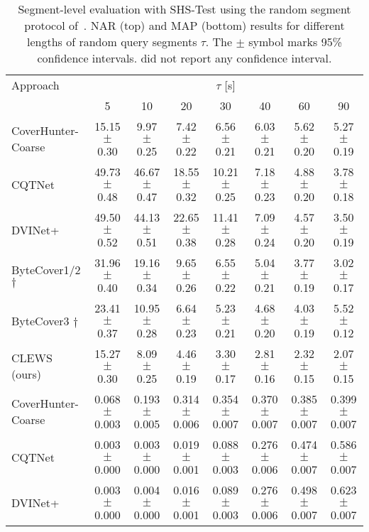 \begin{table*}[h]
\caption{Segment-level evaluation with SHS-Test using the random segment protocol of~\citet{du_bytecover3_2023}. NAR (top) and MAP (bottom) results for different lengths of random query segments $\tau$. The $\pm$ symbol marks 95\% confidence intervals. \citet{du_bytecover3_2023} did not report any confidence interval.}
\label{tab:seg_shsrand}
\vskip 0.15in
\begin{adjustbox}{max width=\textwidth}
\begin{sc}
\begin{tabular}{lccccccc}
\toprule
Approach & \multicolumn{7}{c}{$\tau$ [s]} \\
        \cline{2-8}
    & 5 & 10 & 20 & 30 & 40 & 60 & 90 \\
\midrule
CoverHunter-Coarse & 15.15 $\pm$ 0.30 & 9.97 $\pm$ 0.25 & 7.42 $\pm$ 0.22 & 6.56 $\pm$ 0.21 & 6.03 $\pm$ 0.21 & 5.62 $\pm$ 0.20 & 5.27 $\pm$ 0.19 \\
CQTNet & 49.73 $\pm$ 0.48 & 46.67 $\pm$ 0.47 & 18.55 $\pm$ 0.32 & 10.21 $\pm$ 0.25 & 7.18 $\pm$ 0.23 & 4.88 $\pm$ 0.20 & 3.78 $\pm$ 0.18 \\
DVINet+ & 49.50 $\pm$ 0.52 & 44.13 $\pm$ 0.51 & 22.65 $\pm$ 0.38 & 11.41 $\pm$ 0.28 & 7.09 $\pm$ 0.24 & 4.57 $\pm$ 0.20 & 3.50 $\pm$ 0.19 \\
ByteCover1/2 $\dag$ & 31.96 $\pm$ 0.40 & 19.16 $\pm$ 0.34 & 9.65 $\pm$ 0.26 & 6.55 $\pm$ 0.22 & 5.04 $\pm$ 0.21 & 3.77 $\pm$ 0.19 & 3.02 $\pm$ 0.17 \\
ByteCover3 $\dag$ & 23.41 $\pm$ 0.37 & 10.95 $\pm$ 0.28 & 6.64 $\pm$ 0.23 & 5.23 $\pm$ 0.21 & 4.68 $\pm$ 0.20 & 4.03 $\pm$ 0.19 & 5.52 $\pm$ 0.12 \\
CLEWS (ours) & 15.27 $\pm$ 0.30 & 8.09 $\pm$ 0.25 & 4.46 $\pm$ 0.19 & 3.30 $\pm$ 0.17 & 2.81 $\pm$ 0.16 & 2.32 $\pm$ 0.15 & 2.07 $\pm$ 0.15 \\
\midrule
CoverHunter-Coarse & 0.068 $\pm$ 0.003 & 0.193 $\pm$ 0.005 & 0.314 $\pm$ 0.006 & 0.354 $\pm$ 0.007 & 0.370 $\pm$ 0.007 & 0.385 $\pm$ 0.007 & 0.399 $\pm$ 0.007 \\
CQTNet & 0.003 $\pm$ 0.000 & 0.003 $\pm$ 0.000 & 0.019 $\pm$ 0.001 & 0.088 $\pm$ 0.003 & 0.276 $\pm$ 0.006 & 0.474 $\pm$ 0.007 & 0.586 $\pm$ 0.007 \\
DVINet+ & 0.003 $\pm$ 0.000 & 0.004 $\pm$ 0.000 & 0.016 $\pm$ 0.001 & 0.089 $\pm$ 0.003 & 0.276 $\pm$ 0.006 & 0.498 $\pm$ 0.007 & 0.623 $\pm$ 0.007 \\

\end{tabular}
\end{sc}
\end{adjustbox}
\end{table*}
